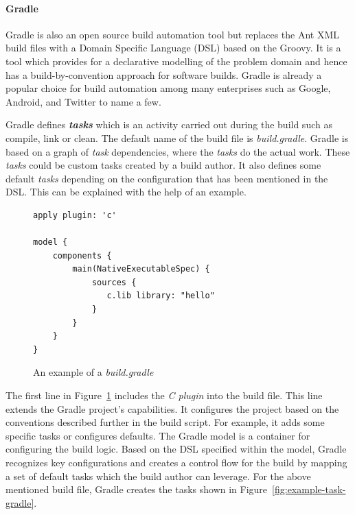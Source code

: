 \documentclass[12pt, a4paper, titlepage]{scrartcl}
\newcommand{\courierword}[1]{\textsf{\itshape #1}}{\fontfamily{pcr}\selectfont}%
\begin{document}
\paragraph{Gradle}
Gradle\cite{dockter2015gradle} is also an open source build automation tool but replaces the Ant XML build files with a Domain Specific Language (DSL)\cite{van2002domain} based on the Groovy\cite{koenig2007groovy}. It is a tool which provides for a declarative modelling of the problem domain and hence has a build-by-convention approach for software builds. Gradle is already a popular choice for build automation among many enterprises such as Google, Android, and Twitter to name a few\cite{gradleCompanies}. 
\par Gradle defines \textit{\textbf{tasks}} which is an activity carried out during the build such as compile, link or clean. The default name of the build file is \courierword{build.gradle}. Gradle is based on a graph of \textit{task} dependencies, where the \textit{tasks} do the actual work. These \textit{tasks} could be custom tasks created by a build author. It also defines some default \textit{tasks} depending on the configuration that has been mentioned in the DSL. This can be explained with the help of an example.

\begin{figure}[!ht]
\begin{lstlisting}[frame=single]
apply plugin: 'c'

model {
    components {
        main(NativeExecutableSpec) {
            sources {
               c.lib library: "hello"
            }
        }
    }
}
\end{lstlisting}
\caption{An example of a \courierword{build.gradle}}
\label{fig:gradle-build-file-example}
\end{figure}
\par The first line in Figure~\ref{fig:gradle-build-file-example} includes the \courierword{C plugin} into the build file. This line extends the Gradle project's capabilities. It configures the project based on the conventions described further in the build script. For example, it adds some specific tasks or configures defaults. The Gradle model is a container for configuring the build logic. Based on the DSL specified within the model, Gradle recognizes key configurations and creates a control flow for the build by mapping a set of default tasks which the build author can leverage. For the above mentioned build file, Gradle creates the tasks shown in Figure~\ref{fig:example-task-gradle}. 
\end{document}
